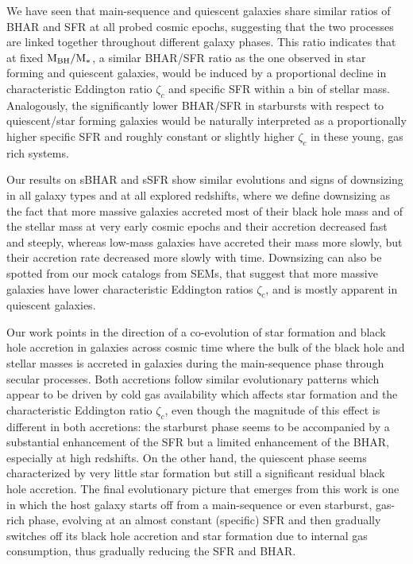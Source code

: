We have seen that main-sequence and quiescent galaxies share similar ratios of BHAR and SFR at all probed cosmic epochs, suggesting that the two processes are linked together throughout different galaxy phases. This ratio indicates that at fixed ${\rm M}_{\rm BH}/{\rm M}_*$, a similar BHAR/SFR ratio as the one observed in star forming and quiescent galaxies, would be induced by a proportional decline in characteristic Eddington ratio $\zeta_c$ and specific SFR within a bin of stellar mass. Analogously, the significantly lower BHAR/SFR in starbursts with respect to quiescent/star forming galaxies would be naturally interpreted as a proportionally higher specific SFR and roughly constant or slightly higher $\zeta_c$ in these young, gas rich systems.

Our results on sBHAR and sSFR show similar evolutions and signs of downsizing in all galaxy types and at all explored redshifts, where we define downsizing as the fact that more massive galaxies accreted most of their black hole mass and of the stellar mass at very early cosmic epochs and their accretion decreased fast and steeply, whereas low-mass galaxies have accreted their mass more slowly, but their accretion rate decreased more slowly with time. Downsizing can also be spotted from our mock catalogs from SEMs, that suggest that more massive galaxies have lower characteristic Eddington ratios $\zeta_c$, and is mostly apparent in quiescent galaxies.

Our work points in the direction of a co-evolution of star formation and black hole accretion in galaxies across cosmic time where the bulk of the black hole and stellar masses is accreted in galaxies during the main-sequence phase through secular processes.
Both accretions follow similar evolutionary patterns which appear to be driven by cold gas availability which affects star formation and the characteristic Eddington ratio $\zeta_c$, even though the magnitude of this effect is different in both accretions: the starburst phase seems to be accompanied by a substantial enhancement of the SFR but a limited enhancement of the BHAR, especially at high redshifts. On the other hand, the quiescent phase seems characterized by very little star formation but still a significant residual black hole accretion. The final evolutionary picture that emerges from this work is one in which the host galaxy starts off from a main-sequence or even starburst, gas-rich phase, evolving at an almost constant (specific) SFR and then gradually switches off its black hole accretion and star formation due to internal gas consumption, thus gradually reducing the SFR and BHAR.

